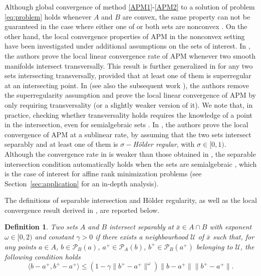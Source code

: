 \documentclass[pdflatex,sn-mathphys-num]{sn-jnl}
\numberwithin{equation}{section}%
\theoremstyle{thmstyleone}%
\theoremstyle{thmstyletwo}%
\theoremstyle{thmstylethree}%
\newtheorem{definition}{Definition}[section]%
\begin{document}
Although global convergence of method \eqref{APM1}-\eqref{APM2} to a solution of problem \eqref{eq:problem} holds whenever $A$ and $B$ are convex, the same property can not be guaranteed in the case where either one of or both sets are nonconvex \cite{bauschke2013, Noll-etal-2016}. On the other hand, the local convergence properties of APM in the nonconvex setting have been investigated {under additional assumptions on the sets of interest. In \cite{lewis2008alternating}, the authors prove the local linear convergence rate of APM whenever two smooth manifolds intersect transversally. This result is further generalized in \cite{lewis2009local} for any two sets intersecting transversally, provided that at least one of them is superregular at an intersecting point. In \cite{drusvyatskiyPhDthesis2013} (see also the subsequent work \cite{drusvyatskiy2015transversality}), the authors remove the superregularity assumption and prove the local linear convergence of APM by only requiring transversality (or a slightly weaker version of it). We note that, in practice, checking whether transversality holds requires the knowledge of a point in the intersection, even for semialgebraic sets \cite[p. 1648]{drusvyatskiy2015transversality}. In \cite{Noll-etal-2016}, the authors prove the local convergence of APM at a sublinear rate, by assuming that the two sets intersect separably and  at least one of them is $\sigma-$\emph{H\"older regular}, with $\sigma \in[0,1)$. Although the convergence rate in \cite{Noll-etal-2016} is weaker than those obtained in \cite{drusvyatskiyPhDthesis2013,drusvyatskiy2015transversality,lewis2009local,lewis2008alternating}, the separable intersection condition automatically holds when the sets are semialgebraic \cite[Theorem 3]{Noll-etal-2016}, which is the case of interest for affine rank minimization problems (see Section~\ref{sec:application} for an in-depth analysis).}


The definitions of separable intersection and H\"older regularity, as well as the local convergence result derived in \cite{Noll-etal-2016}, are reported below.

\begin{definition}\label{def:separable_intersection}\cite[Definition 1]{Noll-etal-2016}
    Two sets $A$ and $B$ intersect separably at $\bar{x}\in A\cap B$ with exponent $\omega\in[0,2)$ and constant $\gamma>0$ if there exists a neighbourhood $\mathcal{U}$ of $\bar{x}$ such that, for any points $a\in A$, $b\in\mathcal{P}_B(a)$, $a^+\in\mathcal{P}_A(b)$, $b^+\in\mathcal{P}_B(a^+)$ belonging to $\mathcal{U}$, the following condition holds
    \begin{equation*}
        \langle b-a^+,b^+-a^+\rangle\leq (1-\gamma\|b^+-a^+\|^\omega)\|b-a^+\|\|b^+-a^+\|.
    \end{equation*}
\end{definition}
\end{document}
